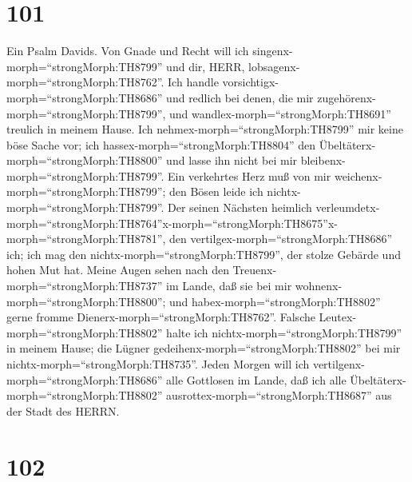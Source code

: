 \hypertarget{section-100}{%
\section{101}\label{section-100}}

 Ein Psalm Davids. Von Gnade und Recht will ich
singenx-morph=``strongMorph:TH8799'' und dir, HERR,
lobsagenx-morph=``strongMorph:TH8762''.  Ich handle
vorsichtigx-morph=``strongMorph:TH8686'' und redlich bei denen, die mir
zugehörenx-morph=``strongMorph:TH8799'', und
wandlex-morph=``strongMorph:TH8691'' treulich in meinem Hause.
 Ich nehmex-morph=``strongMorph:TH8799'' mir keine böse
Sache vor; ich hassex-morph=``strongMorph:TH8804'' den
Übeltäterx-morph=``strongMorph:TH8800'' und lasse ihn nicht bei mir
bleibenx-morph=``strongMorph:TH8799''.  Ein verkehrtes Herz
muß von mir weichenx-morph=``strongMorph:TH8799''; den Bösen leide ich
nichtx-morph=``strongMorph:TH8799''.  Der seinen Nächsten
heimlich
verleumdetx-morph=``strongMorph:TH8764''\textbar x-morph=``strongMorph:TH8675''x-morph=``strongMorph:TH8781'',
den vertilgex-morph=``strongMorph:TH8686'' ich; ich mag den
nichtx-morph=``strongMorph:TH8799'', der stolze Gebärde und hohen Mut
hat.  Meine Augen sehen nach den
Treuenx-morph=``strongMorph:TH8737'' im Lande, daß sie bei mir
wohnenx-morph=``strongMorph:TH8800''; und
habex-morph=``strongMorph:TH8802'' gerne fromme
Dienerx-morph=``strongMorph:TH8762''.  Falsche
Leutex-morph=``strongMorph:TH8802'' halte ich
nichtx-morph=``strongMorph:TH8799'' in meinem Hause; die Lügner
gedeihenx-morph=``strongMorph:TH8802'' bei mir
nichtx-morph=``strongMorph:TH8735''.  Jeden Morgen will ich
vertilgenx-morph=``strongMorph:TH8686'' alle Gottlosen im Lande, daß ich
alle Übeltäterx-morph=``strongMorph:TH8802''
ausrottex-morph=``strongMorph:TH8687'' aus der Stadt des HERRN.

\hypertarget{section-101}{%
\section{102}\label{section-101}}

